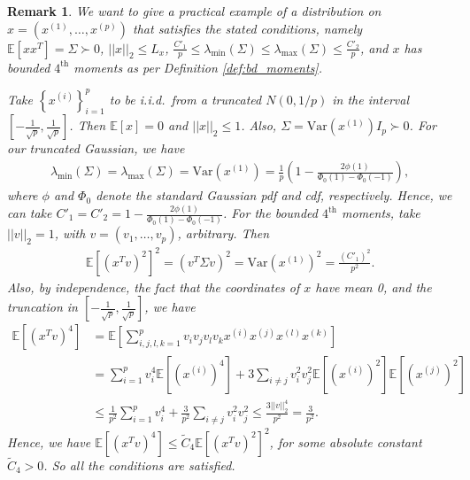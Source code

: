 \documentclass{article}
\newtheorem{remark}{\textbf{Remark}}
\newcommand{\iid}{i.i.d.{\ }}
\begin{document}
\begin{remark}
We want to give a practical example of a distribution on $x = \left(x^{(1)}, \dots, x^{(p)}\right)$ that satisfies the stated conditions, namely $\mathbb{E}[xx^T] = \Sigma \succ 0$, $||x||_2 \leq L_x$, $\frac{C'_1}{p} \leq \lambda_{\min}(\Sigma) \leq \lambda_{\max}(\Sigma) \leq \frac{C'_2}{p}$, and $x$ has bounded $4^{\text{th}}$ moments as per Definition \ref{def:bd_moments}.

Take $\left\{x^{(i)}\right\}_{i = 1}^p$ to be \iid from a truncated $N(0, 1/p)$ in the interval $\left[-\frac{1}{\sqrt{p}}, \frac{1}{\sqrt{p}}\right]$. Then $\mathbb{E}[x] = 0$ and $||x||_2 \leq 1$. Also, $\Sigma = \mathrm{Var}\left(x^{(1)}\right)I_p \succ 0$. For our truncated Gaussian, we have
\begin{align*}
\lambda_{\min}(\Sigma) = \lambda_{\max}(\Sigma) = \mathrm{Var}\left(x^{(1)}\right) = \frac{1}{p}\left(1 - \frac{2\phi(1)}{\Phi_0(1) - \Phi_0(-1)}\right),
\end{align*}
where $\phi$ and $\Phi_0$ denote the standard Gaussian pdf and cdf, respectively. Hence, we can take $C'_1 = C'_2 = 1 - \frac{2\phi(1)}{\Phi_0(1) - \Phi_0(-1)}$. For the bounded $4^{\text{th}}$ moments, take $||v||_2 = 1$, with $v = (v_1, \dots, v_p)$, arbitrary. Then
\begin{align*}
\mathbb{E}\left[(x^Tv)^2\right]^2 = \left(v^T\Sigma v\right)^2 = \mathrm{Var}\left(x^{(1)}\right)^2 = \frac{(C'_1)^2}{p^2}.
\end{align*}
Also, by independence, the fact that the coordinates of $x$ have mean 0, and the truncation in $\left[-\frac{1}{\sqrt{p}}, \frac{1}{\sqrt{p}}\right]$, we have
\begin{align*}
\mathbb{E}\left[(x^Tv)^4\right] &= \mathbb{E}\left[\sum_{i, j, l, k = 1}^pv_iv_jv_lv_kx^{(i)}x^{(j)}x^{(l)}x^{(k)}\right]\\
&= \sum_{i = 1}^pv_i^4\mathbb{E}\left[\left(x^{(i)}\right)^4\right] + 3\sum_{i \neq j}v_i^2v_j^2\mathbb{E}\left[\left(x^{(i)}\right)^2\right]\mathbb{E}\left[\left(x^{(j)}\right)^2\right]\\
&\leq \frac{1}{p^2}\sum_{i = 1}^pv_i^4 + \frac{3}{p^2}\sum_{i \neq j}v_i^2v_j^2 \leq \frac{3||v||_2^4}{p^2} = \frac{3}{p^2}.
\end{align*}
Hence, we have $\mathbb{E}\left[(x^Tv)^4\right] \leq \widetilde{C}_4\mathbb{E}\left[(x^Tv)^2\right]^2$, for some absolute constant $\widetilde{C}_4 > 0$. So all the conditions are satisfied.
\end{remark}
\end{document}
